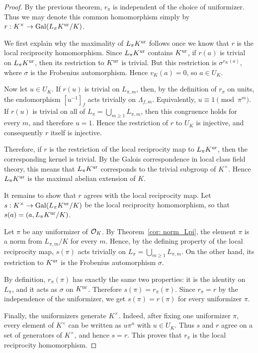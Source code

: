 \begin{proof}
    By the previous theorem, $r_\pi$ is independent of the choice of
    uniformizer. Thus we may denote this common homomorphism simply by
    $r:K^\times\to \mathrm{Gal}(L_\pi K^{\mathrm{ur}}/K)$.

    We first explain why the maximality of $L_\pi K^{\mathrm{ur}}$ follows once we know
    that $r$ is the local reciprocity homomorphism. Since $L_\pi K^{\mathrm{ur}}$ contains
    $K^{\mathrm{ur}}$, if $r(a)$ is trivial on $L_\pi K^{\mathrm{ur}}$, then its restriction to $K^{\mathrm{ur}}$
    is trivial. But this restriction is $\sigma^{v_K(a)}$, where $\sigma$ is
    the Frobenius automorphism. Hence $v_K(a)=0$, so $a\in U_K$.

    Now let $u\in U_K$. If $r(u)$ is trivial on $L_{\pi,m}$, then, by the
    definition of $r_\pi$ on units, the endomorphism $[u^{-1}]_f$ acts
    trivially on $\Lambda_{f,m}$. Equivalently, $u\equiv 1 \pmod{\pi^m}$.
    If $r(u)$ is trivial on all of $L_\pi=\bigcup_{m\geq 1}L_{\pi,m}$, then
    this congruence holds for every $m$, and therefore $u=1$. Hence the
    restriction of $r$ to $U_K$ is injective, and consequently $r$ itself is
    injective.

    Therefore, if $r$ is the restriction of the local reciprocity map to
    $L_\pi K^{\mathrm{ur}}$, then the corresponding kernel is trivial. By the Galois
    correspondence in local class field theory, this means that $L_\pi K^{\mathrm{ur}}$
    corresponds to the trivial subgroup of $K^\times$. Hence $L_\pi K^{\mathrm{ur}}$ is
    the maximal abelian extension of $K$.

    It remains to show that $r$ agrees with the local reciprocity map. Let
    $s:K^\times\to \mathrm{Gal}(L_\pi K^{\mathrm{ur}}/K)$ be the local reciprocity homomorphism,
    so that $s(a)=(a,L_\pi K^{\mathrm{ur}}/K)$.

    Let $\pi$ be any uniformizer of $\mathcal{O}_K$. By Theorem~\ref{cor: norm_Lpi},
    the element $\pi$ is a norm from $L_{\pi,m}/K$ for every $m$. Hence, by the
    defining property of the local reciprocity map, $s(\pi)$ acts trivially on
    $L_\pi=\bigcup_{m\geq 1}L_{\pi,m}$. On the other hand, its restriction to
    $K^{\mathrm{ur}}$ is the Frobenius automorphism $\sigma$.

    By definition, $r_\pi(\pi)$ has exactly the same two properties: it is the
    identity on $L_\pi$, and it acts as $\sigma$ on $K^{\mathrm{ur}}$. Therefore
    $s(\pi)=r_\pi(\pi)$. Since $r_\pi=r$ by the independence of the uniformizer,
    we get $s(\pi)=r(\pi)$ for every uniformizer $\pi$.

    Finally, the uniformizers generate $K^\times$. Indeed, after fixing one
    uniformizer $\pi$, every element of $K^\times$ can be written as
    $u\pi^n$ with $u\in U_K$. Thus $s$
    and $r$ agree on a set of generators of $K^\times$, and hence $s=r$.
    This proves that $r_\pi$ is the local reciprocity homomorphism.
\end{proof}



